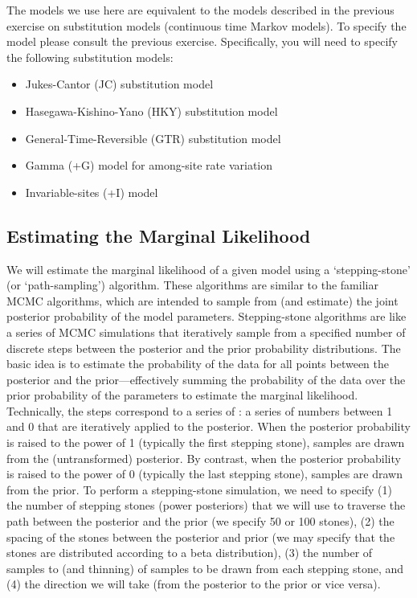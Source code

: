 The models we use here are equivalent to the models described in the previous exercise on substitution models (continuous time Markov models).
To specify the model please consult the previous exercise. Specifically, you will need to specify the following substitution models:
\begin{itemize}
\item Jukes-Cantor (JC) substitution model \citep{Jukes1969}
\item Hasegawa-Kishino-Yano (HKY) substitution model \citep{Hasegawa1985}
\item General-Time-Reversible (GTR) substitution model \citep{Tavare1986}
\item Gamma (+G) model for among-site rate variation \citep{Yang1994a}
\item Invariable-sites (+I) model \citep{Hasegawa1985}
\end{itemize}


\bigskip
\subsection{Estimating the Marginal Likelihood}

We will estimate the marginal likelihood of a given model using a `stepping-stone' (or `path-sampling') algorithm.
These algorithms are similar to the familiar MCMC algorithms, which are intended to sample from (and estimate) the joint posterior probability of the model parameters.
Stepping-stone algorithms are like a series of MCMC simulations that iteratively sample from a specified number of discrete steps between the posterior and the prior probability distributions.
The basic idea is to estimate the probability of the data for all points between the posterior and the prior---effectively summing the probability of the data over the prior probability of the parameters to estimate the marginal likelihood. 
Technically, the steps correspond to a series of : a series of numbers between 1 and 0 that are iteratively applied to the posterior.
When the posterior probability is raised to the power of 1 (typically the first stepping stone), samples are drawn from the (untransformed) posterior.
By contrast, when the posterior probability is raised to the power of 0 (typically the last stepping stone), samples are drawn from the prior.
To perform a stepping-stone simulation, we need to specify (1) the number of stepping stones (power posteriors) that we will use to traverse the path between the posterior and the prior (\EG we specify 50 or 100 stones), (2) the spacing of the stones between the posterior and prior (\EG we may specify that the stones are distributed according to a beta distribution), (3) the number of samples to (and thinning) of samples to be drawn from each stepping stone, and (4) the direction we will take (\IE from the posterior to the prior or vice versa).



